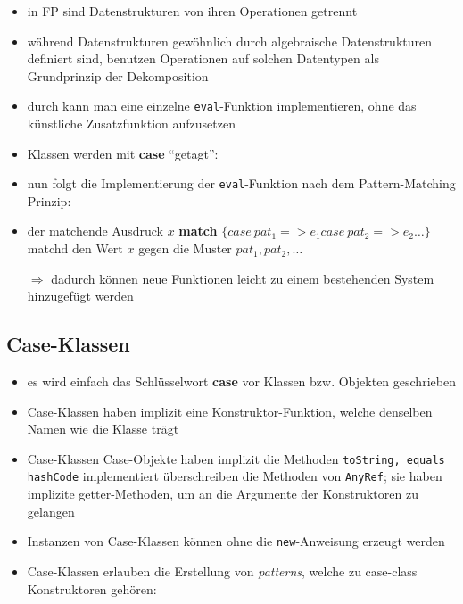

\begin{itemize}
  \item in FP sind Datenstrukturen von ihren Operationen getrennt  
  \item während Datenstrukturen gewöhnlich durch algebraische Datenstrukturen
  definiert sind, benutzen Operationen auf solchen Datentypen 
   als Grundprinzip der Dekomposition
  \item durch  kann man eine einzelne 
  \texttt{eval}-Funktion implementieren, ohne das künstliche Zusatzfunktion
  aufzusetzen
  \item Klassen werden mit \textbf{case} \enquote{getagt}:
  
  
  \item nun folgt die Implementierung der \texttt{eval}-Funktion nach dem
  Pattern-Matching Prinzip:
  
  
  
  \item der matchende Ausdruck $x$ \textbf{match} $\{ case\: pat_1 => e_1
  case\: pat_2 => e_2 \ldots \}$ matchd den Wert $x$ gegen die Muster $pat_1, 
  pat_2, \ldots$
  
  
  $\Rightarrow$ dadurch können neue Funktionen leicht zu einem bestehenden
  System hinzugefügt werden
\end{itemize}


\subsection{Case-Klassen}
\begin{itemize}
  \item es wird einfach das Schlüsselwort \textbf{case} vor Klassen bzw. 
  Objekten geschrieben
  \item Case-Klassen haben implizit eine Konstruktor-Funktion, welche denselben
  Namen wie die Klasse trägt
  \item Case-Klassen \und Case-Objekte haben implizit die Methoden
  \texttt{toString, equals} \und \texttt{hashCode} implementiert \und 
  überschreiben die Methoden von \texttt{AnyRef}; sie haben implizite 
  getter-Methoden, um an die Argumente der Konstruktoren zu gelangen
  \item Instanzen von Case-Klassen können ohne die \texttt{new}-Anweisung
  erzeugt werden
  
    
  
  \item Case-Klassen erlauben die Erstellung von \textit{patterns}, welche
  zu case-class Konstruktoren gehören:
  
  
  
\end{itemize}


